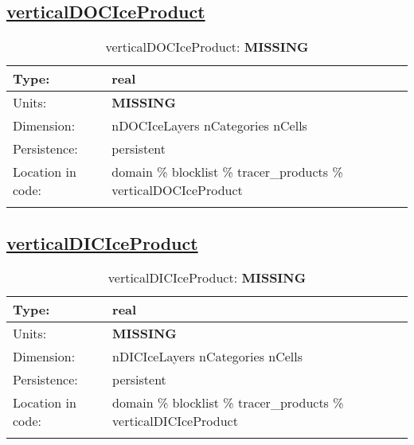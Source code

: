 \subsection[verticalDOCIceProduct]{\hyperref[sec:var_tab_tracer_products]{verticalDOCIceProduct}}
\label{subsec:var_sec_tracer_products_verticalDOCIceProduct}
\begin{center}
\begin{longtable}{| p{2.0in} | p{4.0in} |}
        \hline 
        Type: & real \\
        \hline 
        Units: & {\bf \color{red} MISSING} \\
        \hline 
        Dimension: & nDOCIceLayers nCategories nCells \\
        \hline 
        Persistence: & persistent \\
        \hline 
         Location in code: & domain \% blocklist \% tracer\_products \% verticalDOCIceProduct \\
         \hline 
    \caption{verticalDOCIceProduct: {\bf \color{red} MISSING}}
\end{longtable}
\end{center}
\subsection[verticalDICIceProduct]{\hyperref[sec:var_tab_tracer_products]{verticalDICIceProduct}}
\label{subsec:var_sec_tracer_products_verticalDICIceProduct}
\begin{center}
\begin{longtable}{| p{2.0in} | p{4.0in} |}
        \hline 
        Type: & real \\
        \hline 
        Units: & {\bf \color{red} MISSING} \\
        \hline 
        Dimension: & nDICIceLayers nCategories nCells \\
        \hline 
        Persistence: & persistent \\
        \hline 
         Location in code: & domain \% blocklist \% tracer\_products \% verticalDICIceProduct \\
         \hline 
    \caption{verticalDICIceProduct: {\bf \color{red} MISSING}}
\end{longtable}
\end{center}
